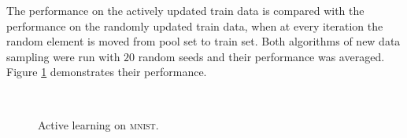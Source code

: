 \documentclass[letterpaper]{article}
\begin{document}
The performance on the actively updated train data is compared with the performance on the randomly updated train data, when at every iteration the random element is moved from pool set to train set. Both algorithms of new data sampling were run with $20$ random seeds and their performance was averaged. Figure \ref{fig:active_learning_mnist} demonstrates their performance.
\begin{figure}[t]
 \\
\caption{Active learning on \textsc{mnist}.}
\label{fig:active_learning_mnist}
\end{figure}
\end{document}
